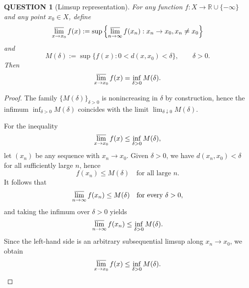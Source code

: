 \documentclass[12pt]{article}
\renewcommand{\(}{\left(}%
\renewcommand{\)}{\right)}%
\renewcommand{\[}{\left[}%
\renewcommand{\]}{\right]}%
\newtheorem{question}{QUESTION}[section]}
\newtheorem{proof}{Proof.}}
\begin{document}
\begin{question}[Limsup representation]
For any function $f : X \to \mathbb{R} \cup \{-\infty\}$ and any point
$x_0 \in X$, define 
\begin{equation*}
    \varlimsup_{x\to x_0}f(x):=\sup\left\{\varlimsup_{n\to\infty} f(x_n):x_n\to x_0,x_n\neq x_0 \right\}
\end{equation*}
and
\begin{equation*}
M(\delta)
:=
\sup\{ f(x) : 0 < d(x,x_0) < \delta\},
\qquad \delta > 0.
\end{equation*}
Then
\begin{equation*}
\varlimsup_{x \to x_0} f(x)
=
\inf_{\delta > 0} M(\delta).
\end{equation*}
\end{question}

\begin{proof}
The family $\{M(\delta)\}_{\delta>0}$ is nonincreasing in $\delta$ by
construction, hence the infimum $\inf_{\delta>0} M(\delta)$ coincides
with the limit $\lim_{\delta \downarrow 0} M(\delta)$.

For the inequality
\begin{equation*}
\varlimsup_{x \to x_0} f(x)
\leq
\inf_{\delta > 0} M(\delta),
\end{equation*}
let $(x_n)$ be any sequence with $x_n \to x_0$.
Given $\delta > 0$, we have $d(x_n,x_0) < \delta$ for all sufficiently
large $n$, hence
\begin{equation*}
f(x_n) \leq M(\delta)
\quad\text{for all large } n.
\end{equation*}
It follows that
\begin{equation*}
\varlimsup_{n\to\infty} f(x_n) \leq M(\delta)
\quad\text{for every } \delta>0,
\end{equation*}
and taking the infimum over $\delta>0$ yields
\begin{equation*}
\varlimsup_{n\to\infty} f(x_n)
\leq
\inf_{\delta>0} M(\delta).
\end{equation*}
Since the left-hand side is an arbitrary subsequential limsup along
$x_n \to x_0$, we obtain
\begin{equation*}
\varlimsup_{x \to x_0} f(x)
\leq
\inf_{\delta>0} M(\delta).
\end{equation*}


\end{proof}
\end{document}
